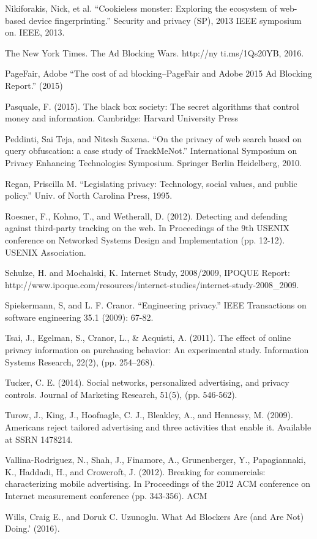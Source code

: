 \documentclass[conference]{IEEEtran}
\begin{document}
\begin{thebibliography}{99}
 Nikiforakis, Nick, et al. ``Cookieless monster: Exploring the ecosystem of web-based device fingerprinting.'' Security and privacy (SP), 2013 IEEE symposium on. IEEE, 2013.

 The New York Times. The Ad Blocking Wars. http://ny ti.ms/1Qs20YB, 2016.

 PageFair, Adobe ``The cost of ad blocking–PageFair and Adobe 2015 Ad Blocking Report.'' (2015)

 Pasquale, F. (2015). The black box society: The secret algorithms that control money and information. Cambridge: Harvard University Press

 Peddinti, Sai Teja, and Nitesh Saxena. ``On the privacy of web search based on query obfuscation: a case study of TrackMeNot.'' International Symposium on Privacy Enhancing Technologies Symposium. Springer Berlin Heidelberg, 2010.

 Regan, Priscilla M. ``Legislating privacy: Technology, social values, and public policy.'' Univ. of North Carolina Press, 1995.

 Roesner, F., Kohno, T., and Wetherall, D. (2012). Detecting and defending against third-party tracking on the web. In Proceedings of the 9th USENIX conference on Networked Systems Design and Implementation (pp. 12-12). USENIX Association. 

 Schulze, H. and Mochalski, K. Internet Study, 2008/2009, IPOQUE Report:
http://www.ipoque.com/resources/internet-studies/internet-study-2008\_2009.

 Spiekermann, S, and L. F. Cranor. ``Engineering privacy.'' IEEE Transactions on software engineering 35.1 (2009): 67-82.

 Tsai, J., Egelman, S., Cranor, L., \& Acquisti, A. (2011). The effect of online privacy information on purchasing behavior: An experimental study. Information Systems Research, 22(2), (pp. 254–268).

 Tucker, C. E. (2014). Social networks, personalized advertising, and privacy controls. Journal of Marketing Research, 51(5), (pp. 546-562).

 Turow, J., King, J., Hoofnagle, C. J., Bleakley, A., and Hennessy, M. (2009). Americans reject tailored advertising and three activities that enable it. Available at SSRN 1478214.

 Vallina-Rodriguez, N., Shah, J., Finamore, A., Grunenberger, Y., Papagiannaki, K., Haddadi, H., and Crowcroft, J. (2012). Breaking for commercials: characterizing mobile advertising. In Proceedings of the 2012 ACM conference on Internet measurement conference (pp. 343-356). ACM

 Wills, Craig E., and Doruk C. Uzunoglu. What Ad Blockers Are (and Are Not) Doing.' (2016).

\end{thebibliography}
\end{document}
